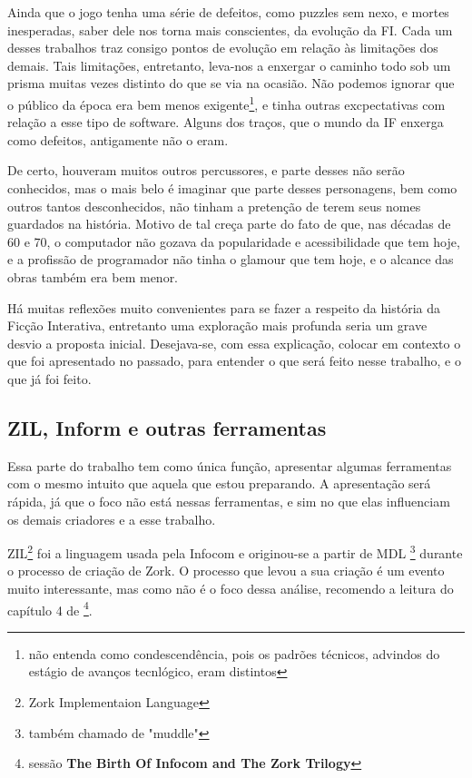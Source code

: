 Ainda que o jogo tenha uma série de defeitos, como puzzles sem nexo, e mortes
inesperadas, saber dele nos torna mais conscientes, da evolução da FI. Cada um
desses trabalhos traz consigo pontos de evolução em relação às limitações dos
demais. Tais limitações, entretanto, leva-nos a enxergar o caminho todo sob
um prisma muitas vezes distinto do que se via na ocasião. Não podemos ignorar
que o público da época era bem menos exigente\footnote{não entenda como
condescendência, pois os padrões técnicos, advindos do estágio de avanços
tecnlógico, eram distintos}, e tinha outras excpectativas com relação a esse tipo
de software. Alguns dos traços, que o mundo da IF enxerga como defeitos,
antigamente não o eram.

De certo, houveram muitos outros percussores, e parte desses não serão
conhecidos, mas o mais belo é imaginar que parte desses personagens, bem como
outros tantos desconhecidos, não tinham a pretenção de terem seus nomes guardados
na história. Motivo de tal creça parte do fato de que, nas décadas de 60 e 70, o
computador não gozava da popularidade e acessibilidade que tem hoje, e a
profissão de programador não tinha o glamour que tem hoje, e o alcance das obras
também era bem menor.

Há muitas reflexões muito convenientes para se fazer a respeito da história da
Ficção Interativa, entretanto uma exploração mais profunda seria um grave desvio
a proposta inicial. Desejava-se, com essa explicação, colocar em contexto o que
foi apresentado no passado, para entender o que será feito nesse trabalho, e o
que já foi feito.

\subsection{ZIL, Inform e outras ferramentas}
\label{subsec:tools}

Essa parte do trabalho tem como única função, apresentar algumas ferramentas com
o mesmo intuito que aquela que estou preparando. A apresentação será rápida, já
que o foco não está nessas ferramentas, e sim no que elas influenciam os demais
criadores e a esse trabalho.

ZIL\footnote{Zork Implementaion Language} foi a linguagem usada pela Infocom e
originou-se a partir de MDL \footnote{também chamado de "muddle"} durante o
processo de criação de Zork. O processo que levou a sua criação é um evento muito
interessante, mas como não é o foco dessa análise, recomendo a leitura do
capítulo 4 de \citep{Jim:06} \footnote{sessão \textbf{The Birth Of Infocom and
The Zork Trilogy}}.

